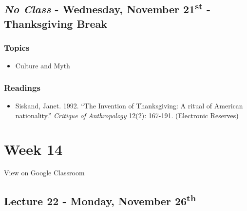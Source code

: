 \documentclass[]{book}
\providecommand{\tightlist}{%
  \setlength{\itemsep}{0pt}\setlength{\parskip}{0pt}}
\theoremstyle{definition}
\theoremstyle{definition}
\theoremstyle{definition}
\theoremstyle{remark}
\begin{document}
\hypertarget{no-class---wednesday-november-21st---thanksgiving-break}{%
\subsection*{\texorpdfstring{\emph{No Class} - Wednesday, November
21\textsuperscript{st} - Thanksgiving
Break}{No Class - Wednesday, November 21st - Thanksgiving Break}}\label{no-class---wednesday-november-21st---thanksgiving-break}}

\hypertarget{topics-25}{%
\subsubsection*{Topics}\label{topics-25}}

\begin{itemize}
\tightlist
\item
  Culture and Myth
\end{itemize}

\hypertarget{readings-23}{%
\subsubsection*{Readings}\label{readings-23}}

\begin{itemize}
\tightlist
\item
  Siskand, Janet. 1992. ``The Invention of Thanksgiving: A ritual of
  American nationality.'' \emph{Critique of Anthropology} 12(2):
  167-191. (Electronic Reserves)
\end{itemize}

\hypertarget{week-14}{%
\section*{Week 14}\label{week-14}}

View on Google Classroom

\hypertarget{lecture-22---monday-november-26th}{%
\subsection*{\texorpdfstring{Lecture 22 - Monday, November
26\textsuperscript{th}}{Lecture 22 - Monday, November 26th}}\label{lecture-22---monday-november-26th}}
\end{document}
